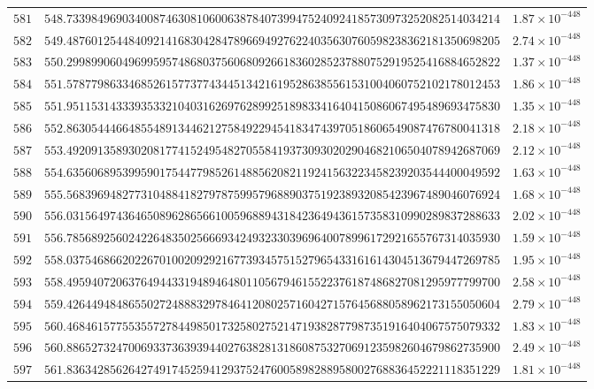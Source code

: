 \documentclass[12pt,reqno]{amsart}
\theoremstyle{remark}
\begin{document}
\begin{longtable}{clc}
$581$ & $548.7339849690340087463081060063878407399475240924185730973252082514034214$ & $1.87\times 10^{-448}$ \\
$582$ & $549.4876012544840921416830428478966949276224035630760598238362181350698205$ & $2.74\times 10^{-448}$ \\
$583$ & $550.2998990604969959574868037560680926618360285237880752919525416884652822$ & $1.37\times 10^{-448}$ \\
$584$ & $551.5787798633468526157737743445134216195286385561531004060752102178012453$ & $1.86\times 10^{-448}$ \\
$585$ & $551.9511531433393533210403162697628992518983341640415086067495489693475830$ & $1.35\times 10^{-448}$ \\
$586$ & $552.8630544466485548913446212758492294541834743970518606549087476780041318$ & $2.18\times 10^{-448}$ \\
$587$ & $553.4920913589302081774152495482705584193730930202904682106504078942687069$ & $2.12\times 10^{-448}$ \\
$588$ & $554.6356068953995901754477985261488562082119241563223458239203544400049592$ & $1.63\times 10^{-448}$ \\
$589$ & $555.5683969482773104884182797875995796889037519238932085423967489046076924$ & $1.68\times 10^{-448}$ \\
$590$ & $556.0315649743646508962865661005968894318423649436157358310990289837288633$ & $2.02\times 10^{-448}$ \\
$591$ & $556.7856892560242264835025666934249323303969640078996172921655767314035930$ & $1.59\times 10^{-448}$ \\
$592$ & $558.0375468662022670100209292167739345751527965433161614304513679447269785$ & $1.95\times 10^{-448}$ \\
$593$ & $558.4959407206376494433194894648011056794615522376187486827081295977799700$ & $2.58\times 10^{-448}$ \\
$594$ & $559.4264494848655027248883297846412080257160427157645688058962173155050604$ & $2.79\times 10^{-448}$ \\
$595$ & $560.4684615775535572784498501732580275214719382877987351916404067575079332$ & $1.83\times 10^{-448}$ \\
$596$ & $560.8865273247006933736393944027638281318608753270691235982604679862735900$ & $2.49\times 10^{-448}$ \\
$597$ & $561.8363428562642749174525941293752476005898288958002768836452221118351229$ & $1.81\times 10^{-448}$ \\

\end{longtable}
\end{document}
